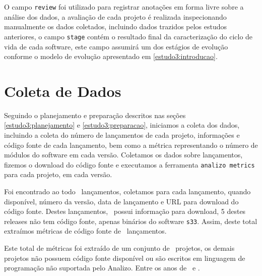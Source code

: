 O campo \texttt{review} foi utilizado para registrar anotações em forma livre
sobre a análise dos dados, a avaliação de cada projeto é realizada
inspecionando manualmente os dados coletados, incluindo dados trazidos pelos
estudos anteriores, o campo \texttt{stage} contém o resultado final da
caracterização do ciclo de vida de cada software, este campo assumirá um dos
estágios de evolução conforme o modelo de evolução apresentado em
\ref{estudo3:introducao}.




\section{Coleta de Dados} \label{estudo3:coleta} %

Seguindo o planejamento e preparação descritos nas seções
\ref{estudo3:planejamento} e \ref{estudo3:preparacao}, iniciamos a coleta dos
dados, incluindo a coleta do número de lançamentos de cada projeto, informações
e código fonte de cada lançamento, bem como a métrica representando o número de
módulos do software em cada versão. Coletamos os dados sobre lançamentos,
fizemos o download do código fonte e executamos a ferramenta \texttt{analizo
metrics} para cada projeto, em cada versão.

Foi encontrado ao todo \ReleasesCount \ lançamentos, coletamos para cada
lançamento, quando disponível, número da versão, data de lançamento e URL para
download do código fonte. Destes lançamentos, \ReleasesAvailableCount \ possui
informação para download, 5 destes releases não tem código fonte, apenas
binários do software \texttt{s33}. Assim, deste total extraímos métricas
de código fonte de \ReleasesMetricsCount \ lançamentos.

Este total de métricas foi extraído de um conjunto de \ProjectsAnalizedCount \
projetos, os demais projetos não possuem código fonte disponível ou são
escritos em linguagem de programação não suportada pelo Analizo. Entre os anos
de \ReleasesYearFirst \ e \ReleasesYearLast.

